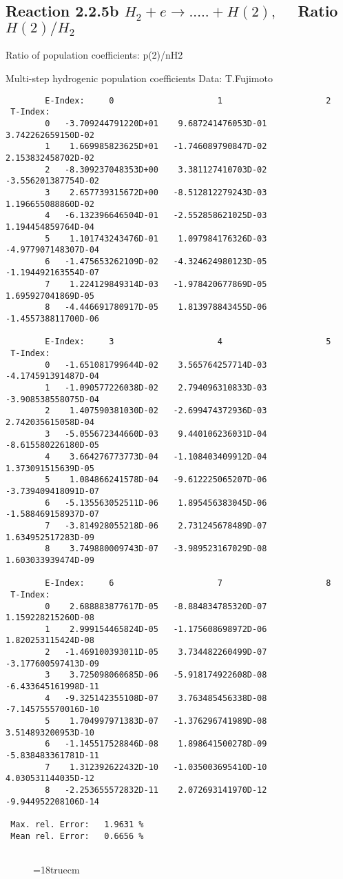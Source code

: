 \subsection{
Reaction 2.2.5b  $H_2 + e \rightarrow .....+H(2)   , \quad $
Ratio $H(2)/H_2 $
}

 Ratio of population coefficients: p(2)/nH2

 Multi-step hydrogenic population coefficients
 Data: T.Fujimoto


\begin{verbatim}
        E-Index:     0                     1                     2
 T-Index:
        0   -3.709244791220D+01    9.687241476053D-01    3.742262659150D-02
        1    1.669985823625D+01   -1.746089790847D-02    2.153832458702D-02
        2   -8.309237048353D+00    3.381127410703D-02   -3.556201387754D-02
        3    2.657739315672D+00   -8.512812279243D-03    1.196655088860D-02
        4   -6.132396646504D-01   -2.552858621025D-03    1.194454859764D-04
        5    1.101743243476D-01    1.097984176326D-03   -4.977907148307D-04
        6   -1.475653262109D-02   -4.324624980123D-05   -1.194492163554D-07
        7    1.224129849314D-03   -1.978420677869D-05    1.695927041869D-05
        8   -4.446691780917D-05    1.813978843455D-06   -1.455738811700D-06

        E-Index:     3                     4                     5
 T-Index:
        0   -1.651081799644D-02    3.565764257714D-03   -4.174591391487D-04
        1   -1.090577226038D-02    2.794096310833D-03   -3.908538558075D-04
        2    1.407590381030D-02   -2.699474372936D-03    2.742035615058D-04
        3   -5.055672344660D-03    9.440106236031D-04   -8.615580226180D-05
        4    3.664276773773D-04   -1.108403409912D-04    1.373091515639D-05
        5    1.084866241578D-04   -9.612225065207D-06   -3.739409418091D-07
        6   -5.135563052511D-06    1.895456383045D-06   -1.588469158937D-07
        7   -3.814928055218D-06    2.731245678489D-07    1.634952517283D-09
        8    3.749880009743D-07   -3.989523167029D-08    1.603033939474D-09

        E-Index:     6                     7                     8
 T-Index:
        0    2.688883877617D-05   -8.884834785320D-07    1.159228215260D-08
        1    2.999154465824D-05   -1.175608698972D-06    1.820253115424D-08
        2   -1.469100393011D-05    3.734482260499D-07   -3.177600597413D-09
        3    3.725098060685D-06   -5.918174922608D-08   -6.433645161998D-11
        4   -9.325142355108D-07    3.763485456338D-08   -7.145755570016D-10
        5    1.704997971383D-07   -1.376296741989D-08    3.514893200953D-10
        6   -1.145517528846D-08    1.898641500278D-09   -5.838483361781D-11
        7    1.312392622432D-10   -1.035003695410D-10    4.030531144035D-12
        8   -2.253655572832D-11    2.072693141970D-12   -9.944952208106D-14

 Max. rel. Error:   1.9631 %
 Mean rel. Error:   0.6656 %


\end{verbatim}
\begin{figure} \label{2.2.5b}
\epsfxsize=18truecm
\end{figure}
\newpage


